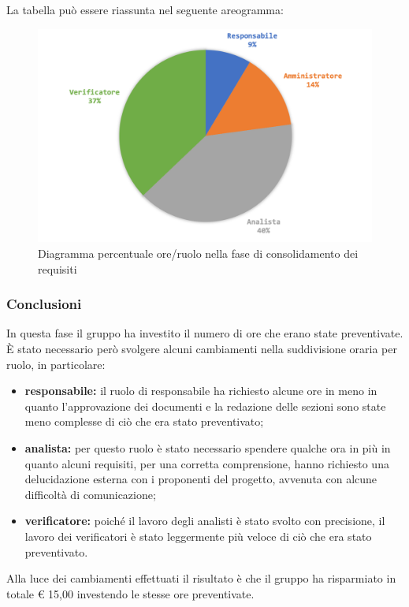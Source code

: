			La tabella può essere riassunta nel seguente areogramma:
			\begin{figure}[H]
				\centering
				\includegraphics[width=0.8\linewidth]{images/consuntivo/ConsReqCons2.png}
				\caption{Diagramma percentuale ore/ruolo nella fase di consolidamento dei requisiti}
				\label{fig:consuntivo diagramma costi ruolo fase di consolidamento dei requisiti}
			\end{figure}
		
		\pagebreak
		
		\subsubsection{Conclusioni }
			In questa fase il gruppo ha investito il numero di ore che erano state preventivate. È stato necessario però svolgere alcuni cambiamenti nella suddivisione oraria per ruolo, in particolare:
			\begin{itemize}
				\item \textbf{responsabile:} il ruolo di responsabile ha richiesto alcune ore in meno in quanto l'approvazione dei documenti e la redazione delle sezioni sono state meno complesse di ciò che era stato preventivato;
				\item \textbf{analista:} per questo ruolo è stato necessario spendere qualche ora in più in quanto alcuni requisiti, per una corretta comprensione, hanno richiesto una delucidazione esterna con i proponenti del progetto, avvenuta con alcune difficoltà di comunicazione;
				\item \textbf{verificatore:} poiché il lavoro degli analisti è stato svolto con precisione, il lavoro dei verificatori è stato leggermente più veloce di ciò che era stato preventivato.
			\end{itemize}
			Alla luce dei cambiamenti effettuati il risultato è che il gruppo ha risparmiato in totale € 15,00 investendo le stesse ore preventivate.
